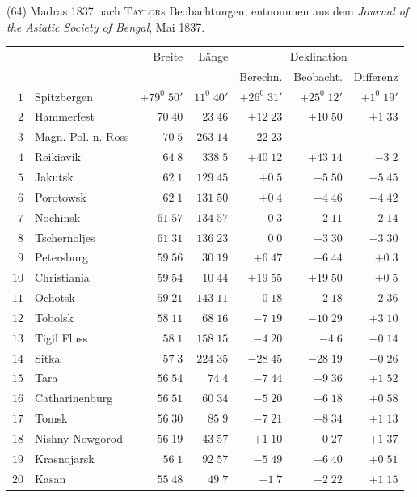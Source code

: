 (64) Madras 1837 nach \textsc{Taylor}s Beobachtungen, entnommen aus dem \textit{Journal of the Asiatic Society of Bengal}, Mai 1837.
\clearpage
{}
\begingroup
\fontsize{9}{10.2}\selectfont
\setlength{\tabcolsep}{2.5pt}
\renewcommand{\arraystretch}{1.02}
\begin{center}
\begin{tabular}{rl|r|r||r|r|r}
\hline
&&Breite&Länge&\multicolumn{3}{c}{Deklination}\\
&&&&Berechn.&Beobacht.&Differenz\\\hline
$1$&Spitzbergen&$+79^0\;50'$&$11^0\;40'$&$+26^0\;31'$&$+25^0\;12'$&$+1^0\;19'$\\
$2$&Hammerfest&$70\;40$&$23\;46$&$+12\;23$&$+10\;50$&$+1\;33$\\
$3$&Magn. Pol. n. Ross&$70\;5$&$263\;14$&$-22\;23$&&\\
$4$&Reikiavik&$64\;8$&$338\;5$&$+40\;12$&$+43\;14$&$-3\;2$\\
$5$&Jakutsk&$62\;1$&$129\;45$&$+0\;5$&$+5\;50$&$-5\;45$\\
$6$&Porotowsk&$62\;1$&$131\;50$&$+0\;4$&$+4\;46$&$-4\;42$\\
$7$&Nochinsk&$61\;57$&$134\;57$&$-0\;3$&$+2\;11$&$-2\;14$\\
$8$&Tschernoljes&$61\;31$&$136\;23$&$0\;0$&$+3\;30$&$-3\;30$\\
$9$&Petersburg&$59\;56$&$30\;19$&$+6\;47$&$+6\;44$&$+0\;3$\\
$10$&Christiania&$59\;54$&$10\;44$&$+19\;55$&$+19\;50$&$+0\;5$\\[2pt]
$11$&Ochotsk&$59\;21$&$143\;11$&$-0\;18$&$+2\;18$&$-2\;36$\\
$12$&Tobolsk&$58\;11$&$68\;16$&$-7\;19$&$-10\;29$&$+3\;10$\\
$13$&Tigil Fluss&$58\;1$&$158\;15$&$-4\;20$&$-4\;6$&$-0\;14$\\
$14$&Sitka&$57\;3$&$224\;35$&$-28\;45$&$-28\;19$&$-0\;26$\\
$15$&Tara&$56\;54$&$74\;4$&$-7\;44$&$-9\;36$&$+1\;52$\\
$16$&Catharinenburg&$56\;51$&$60\;34$&$-5\;20$&$-6\;18$&$+0\;58$\\
$17$&Tomsk&$56\;30$&$85\;9$&$-7\;21$&$-8\;34$&$+1\;13$\\
$18$&Nishny Nowgorod&$56\;19$&$43\;57$&$+1\;10$&$-0\;27$&$+1\;37$\\
$19$&Krasnojarsk&$56\;1$&$92\;57$&$-5\;49$&$-6\;40$&$+0\;51$\\
$20$&Kasan&$55\;48$&$49\;7$&$-1\;7$&$-2\;22$&$+1\;15$\\[2pt]

\end{tabular}
\end{center}
